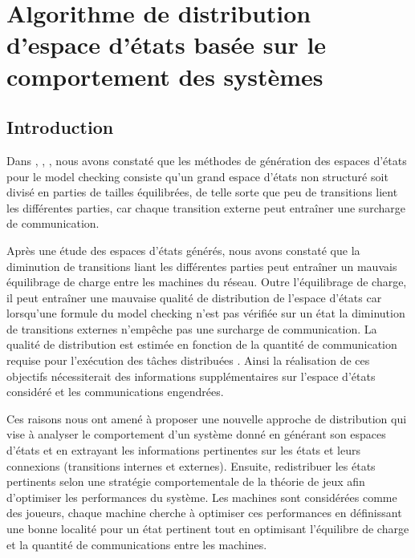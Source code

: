 \chapter{Algorithme de distribution d’espace d’états basée sur le comportement des systèmes}

 \section{Introduction}
Dans \citep{Saidouni2012}, \citep{TabibSaidouni2016}, \citep{BENSETIRA2017}, nous avons constaté que les méthodes de génération des espaces d’états pour le model checking consiste  qu’un grand espace d'états non structuré soit divisé en parties de tailles équilibrées, de telle sorte que peu de transitions lient les différentes  parties, car chaque transition externe peut entraîner une surcharge de communication.

Après une étude des espaces d'états générés, nous avons constaté que la diminution de transitions liant les différentes parties peut entraîner un mauvais équilibrage de charge entre les machines du réseau. Outre l’équilibrage de charge, il peut entraîner une mauvaise qualité de distribution de l'espace d'états car lorsqu'une formule du model checking n'est pas vérifiée sur un état la diminution de transitions externes n'empêche pas une surcharge de communication. La qualité de distribution est estimée en fonction de la quantité de communication requise pour l’exécution des tâches distribuées \citep{EzekielLuttgen2008}. Ainsi la réalisation de ces objectifs nécessiterait des informations supplémentaires sur l’espace d’états considéré et les communications engendrées. 

Ces raisons nous ont amené à proposer une nouvelle approche de distribution qui vise à analyser le comportement d’un système donné en générant son espaces d’états et en extrayant les informations pertinentes sur les états et leurs connexions (transitions internes et externes). Ensuite, redistribuer les états pertinents selon une stratégie comportementale de la théorie de jeux afin d’optimiser les performances du système. Les machines sont considérées comme des joueurs, chaque machine cherche à optimiser ces performances en définissant une bonne localité pour un état pertinent tout en optimisant l’équilibre de charge et la quantité de communications entre les machines.
 
